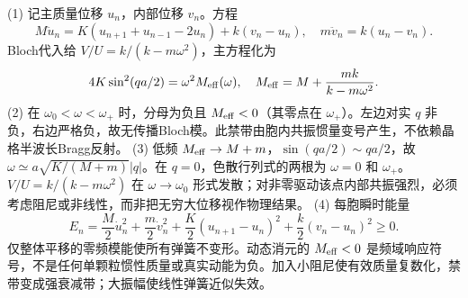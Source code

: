 (1) 记主质量位移 \(u_n\)，内部位移 \(v_n\)。方程
\[
M\ddot u_n=K(u_{n+1}+u_{n-1}-2u_n)+k(v_n-u_n),\quad m\ddot v_n=k(u_n-v_n).
\]
Bloch代入给 \(V/U=k/(k-m\omega^2)\)，主方程化为
\[
4K\sin^2(qa/2)=\omega^2 M_{\rm eff}(\omega),\quad M_{\rm eff}=M+\frac{mk}{k-m\omega^2}.
\]
(2) 在 \(\omega_0<\omega<\omega_+\) 时，分母为负且 \(M_{\rm eff}<0\)（其零点在 \(\omega_+\)）。左边对实 \(q\) 非负，右边严格负，故无传播Bloch模。此禁带由胞内共振惯量变号产生，不依赖晶格半波长Bragg反射。
(3) 低频 \(M_{\rm eff}\to M+m\)，\(\sin(qa/2)\sim qa/2\)，故 \(\omega\simeq a\sqrt{K/(M+m)}|q|\)。在 \(q=0\)，色散行列式的两根为 \(\omega=0\) 和 \(\omega_+\)。\(V/U=k/(k-m\omega^2)\) 在 \(\omega\to\omega_0\) 形式发散；对非零驱动该点内部共振强烈，必须考虑阻尼或非线性，而非把无穷大位移视作物理结果。
(4) 每胞瞬时能量
\[
E_n=\frac M2\dot u_n^2+\frac m2\dot v_n^2+\frac K2(u_{n+1}-u_n)^2+\frac k2(v_n-u_n)^2\ge0.
\]
仅整体平移的零频模能使所有弹簧不变形。动态消元的 \(M_{\rm eff}<0\) 是频域响应符号，不是任何单颗粒惯性质量或真实动能为负。加入小阻尼使有效质量复数化，禁带变成强衰减带；大振幅使线性弹簧近似失效。

